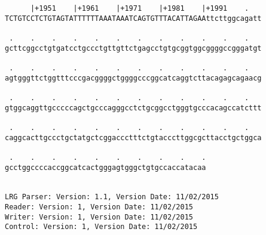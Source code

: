 \documentclass{article}
\begin{document}
\begin{Verbatim}
      |+1951    |+1961    |+1971    |+1981    |+1991    .   
TCTGTCCTCTGTAGTATTTTTTAAATAAATCAGTGTTTACATTAGAAttcttggcagatt
                                                            
 .    .    .    .    .    .    .    .    .    .    .    .   
gcttcggcctgtgatcctgccctgttgttctgagcctgtgcggtggcggggccgggatgt
                                                            
 .    .    .    .    .    .    .    .    .    .    .    .   
agtgggttctggtttcccgacggggctggggcccggcatcaggtcttacagagcagaacg
                                                            
 .    .    .    .    .    .    .    .    .    .    .    .   
gtggcaggttgcccccagctgcccagggcctctgcggcctgggtgcccacagccatcttt
                                                            
 .    .    .    .    .    .    .    .    .    .    .    .   
caggcacttgccctgctatgctcggaccctttctgtacccttggcgcttacctgctggca
                                                            
 .    .    .    .    .    .    .    .    .    .
gcctggccccaccggcatcactgggagtgggctgtgccaccatacaa
                                               
                                               
LRG Parser: Version: 1.1, Version Date: 11/02/2015
Reader: Version: 1, Version Date: 11/02/2015
Writer: Version: 1, Version Date: 11/02/2015
Control: Version: 1, Version Date: 11/02/2015
\end{Verbatim}
\end{document}
